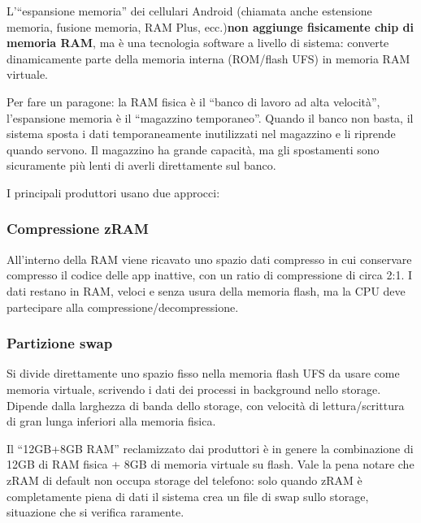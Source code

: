 


L'“espansione memoria” dei cellulari Android (chiamata anche estensione memoria, fusione memoria, RAM Plus, ecc.)\textbf{non aggiunge fisicamente chip di memoria RAM}, ma è una tecnologia software a livello di sistema: converte dinamicamente parte della memoria interna (ROM/flash UFS) in memoria RAM virtuale.

Per fare un paragone: la RAM fisica è il “banco di lavoro ad alta velocità”, l'espansione memoria è il “magazzino temporaneo”. Quando il banco non basta, il sistema sposta i dati temporaneamente inutilizzati nel magazzino e li riprende quando servono. Il magazzino ha grande capacità, ma gli spostamenti sono sicuramente più lenti di averli direttamente sul banco.


I principali produttori usano due approcci:

\subsubsection*{Compressione zRAM}

All'interno della RAM viene ricavato uno spazio dati compresso in cui conservare compresso il codice delle app inattive, con un ratio di compressione di circa 2:1. I dati restano in RAM, veloci e senza usura della memoria flash, ma la CPU deve partecipare alla compressione/decompressione.

\subsubsection*{Partizione swap}

Si divide direttamente uno spazio fisso nella memoria flash UFS da usare come memoria virtuale, scrivendo i dati dei processi in background nello storage. Dipende dalla larghezza di banda dello storage, con velocità di lettura/scrittura di gran lunga inferiori alla memoria fisica.

Il “12GB+8GB RAM” reclamizzato dai produttori è in genere la combinazione di 12GB di RAM fisica + 8GB di memoria virtuale su flash. Vale la pena notare che zRAM di default non occupa storage del telefono: solo quando zRAM è completamente piena di dati il sistema crea un file di swap sullo storage, situazione che si verifica raramente.

